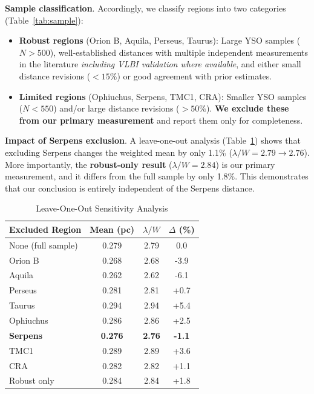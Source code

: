 \documentclass[twoside,twocolumn]{mnras}
\begin{document}
\textbf{Sample classification}. Accordingly, we classify regions into two categories (Table~\ref{tab:sample}):
\begin{itemize}
    \item \textbf{Robust regions} (Orion B, Aquila, Perseus, Taurus): Large YSO samples ($N > 500$), well-established distances with multiple independent measurements in the literature \emph{including VLBI validation where available}, and either small distance revisions ($<15\%$) or good agreement with prior estimates.
    \item \textbf{Limited regions} (Ophiuchus, Serpens, TMC1, CRA): Smaller YSO samples ($N < 550$) and/or large distance revisions ($>50\%$). \textbf{We exclude these from our primary measurement} and report them only for completeness.
\end{itemize}

\textbf{Impact of Serpens exclusion}. A leave-one-out analysis (Table~\ref{tab:leave_one_out}) shows that excluding Serpens changes the weighted mean by only 1.1\% ($\lambda/W = 2.79 \to 2.76$). More importantly, the \textbf{robust-only result} ($\lambda/W = 2.84$) is our primary measurement, and it differs from the full sample by only 1.8\%. This demonstrates that our conclusion is entirely independent of the Serpens distance.

\begin{table}[h]
\caption{Leave-One-Out Sensitivity Analysis}
\label{tab:leave_one_out}
\begin{tabular}{lccc}
\toprule
Excluded Region & Mean (pc) & $\lambda/W$ & $\Delta$ (\%) \\
\midrule
None (full sample) & 0.279 & 2.79 & 0.0 \\
Orion B & 0.268 & 2.68 & -3.9 \\
Aquila & 0.262 & 2.62 & -6.1 \\
Perseus & 0.281 & 2.81 & +0.7 \\
Taurus & 0.294 & 2.94 & +5.4 \\
Ophiuchus & 0.286 & 2.86 & +2.5 \\
\textbf{Serpens} & \textbf{0.276} & \textbf{2.76} & \textbf{-1.1} \\
TMC1 & 0.289 & 2.89 & +3.6 \\
CRA & 0.282 & 2.82 & +1.1 \\
\midrule
Robust only & 0.284 & 2.84 & +1.8 \\
\bottomrule
\end{tabular}
\end{table}
\end{document}
